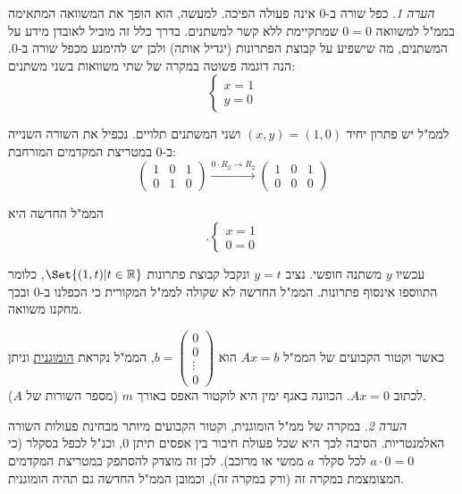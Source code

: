 \documentclass[
  hebrew,
  12pt,
  a4paper,
  oneside]{book}
\theoremstyle{definition}
\theoremstyle{remark}
\theoremstyle{plain}
\theoremstyle{remark}
\newtheorem*{remark}{הערה}
\begin{document}
\begin{remark}
כפל שורה ב-\(0\) אינה פעולה הפיכה. למעשה, הוא הופך את המשוואה המתאימה
בממ"ל למשוואה \(0=0\) שמתקיימת ללא קשר למשתנים. בדרך כלל זה מוביל לאובדן
מידע על המשתנים, מה שישפיע על קבוצת הפתרונות (יגדיל אותה) ולכן יש להימנע
מכפל שורה ב-\(0\). הנה דוגמה פשוטה במקרה של שתי משוואות בשני משתנים:
\[\begin{cases}
x=1\\
y=0
\end{cases}\]

לממ"ל יש פתרון יחיד \((x,y)=(1,0)\) ושני המשתנים תלויים. נכפיל את השורה
השנייה ב-\(0\) במטריצת המקדמים המורחבת: \[\left( \begin{array}{cc|c}
1 & 0 & 1\\
0 & 1 & 0
\end{array}\right) \xrightarrow{0\cdot R_2\to R_2}
    \left( \begin{array}{cc|c}
    1 & 0 & 1\\
    0 & 0 & 0
\end{array} \right)\]

הממ"ל החדשה היא \[.\begin{cases}
x=1\\
0=0
\end{cases}\]

עכשיו \(y\) משתנה חופשי. נציב \(y=t\) ונקבל קבוצת פתרונות
\(\Set{(1,t)|t\in\mathbb R}\), כלומר התווספו אינסוף פתרונות. הממ"ל החדשה
לא שקולה לממ"ל המקורית כי הכפלנו ב-\(0\) ובכך מחקנו משוואה.
\end{remark}

\begin{definition}

כאשר וקטור הקבועים של הממ"ל \(Ax=b\) הוא \(b=\begin{pmatrix}0\\
0\\
\vdots\\
0
\end{pmatrix}\), הממ"ל נקראת \ul{הומוגנית} וניתן לכתוב \(Ax=0\). הכוונה
באגף ימין היא לוקטור האפס באורך \(m\) (מספר השורות של \(A\)).

\end{definition}

\begin{remark}
במקרה של ממ"ל הומוגנית, וקטור הקבועים מיותר מבחינת פעולות השורה
האלמנטריות. הסיבה לכך היא שכל פעולת חיבור בין אפסים תיתן 0, וכנ"ל לכפל
בסקלר (כי \(a\cdot 0=0\) לכל סקלר \(a\) ממשי או מרוכב). לכן זה מוצדק
להסתפק במטריצת המקדמים המצומצמת במקרה זה (ורק במקרה זה), וכמובן הממ"ל
החדשה גם תהיה הומוגנית.
\end{remark}
\end{document}
